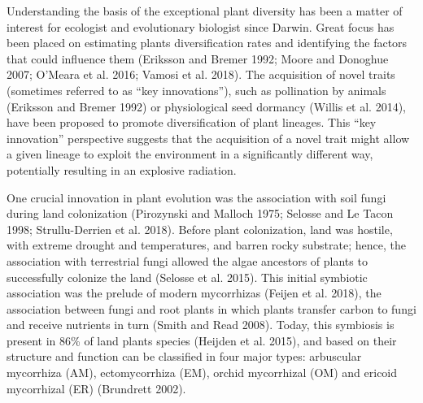 \documentclass[12pt,]{article}
\begin{document}
Understanding the basis of the exceptional plant diversity has been a
matter of interest for ecologist and evolutionary biologist since
Darwin. Great focus has been placed on estimating plants diversification
rates and identifying the factors that could influence them (Eriksson
and Bremer 1992; Moore and Donoghue 2007; O'Meara et al. 2016; Vamosi et
al. 2018). The acquisition of novel traits (sometimes referred to as
``key innovations''), such as pollination by animals (Eriksson and
Bremer 1992) or physiological seed dormancy (Willis et al. 2014), have
been proposed to promote diversification of plant lineages. This ``key
innovation'' perspective suggests that the acquisition of a novel trait
might allow a given lineage to exploit the environment in a
significantly different way, potentially resulting in an explosive
radiation.

One crucial innovation in plant evolution was the association with soil
fungi during land colonization (Pirozynski and Malloch 1975; Selosse and
Le Tacon 1998; Strullu-Derrien et al. 2018). Before plant colonization,
land was hostile, with extreme drought and temperatures, and barren
rocky substrate; hence, the association with terrestrial fungi allowed
the algae ancestors of plants to successfully colonize the land (Selosse
et al. 2015). This initial symbiotic association was the prelude of
modern mycorrhizas (Feijen et al. 2018), the association between fungi
and root plants in which plants transfer carbon to fungi and receive
nutrients in turn (Smith and Read 2008). Today, this symbiosis is
present in 86\% of land plants species (Heijden et al. 2015), and based
on their structure and function can be classified in four major types:
arbuscular mycorrhiza (AM), ectomycorrhiza (EM), orchid mycorrhizal (OM)
and ericoid mycorrhizal (ER) (Brundrett 2002).
\end{document}
